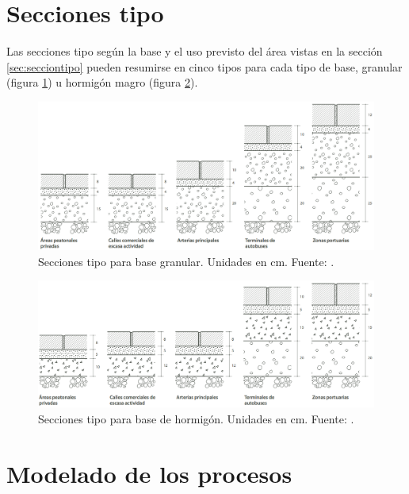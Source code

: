 \section{Secciones tipo}

Las secciones tipo según la base y el uso previsto del área vistas en la sección \ref{sec:secciontipo} pueden resumirse en cinco tipos para cada tipo de base, granular (figura \ref{fig:seccionestipogranular}) u hormigón magro (figura \ref{fig:seccionestipohormigon}).

\begin{figure}[!htb]
\centering
\includegraphics[width=15cm]{seccionestipo_1.png}
\caption[Secciones tipo para base granular.]{Secciones tipo para base granular. Unidades en cm. Fuente: \cite{fenollar}.}
\label{fig:seccionestipogranular}
\end{figure}

\begin{figure}[!htb]
\centering
\includegraphics[width=15cm]{seccionestipo_2.png}
\caption[Secciones tipo para base de hormigón.]{Secciones tipo para base de hormigón. Unidades en cm. Fuente: \cite{fenollar}.}
\label{fig:seccionestipohormigon}
\end{figure}

\section{Modelado de los procesos}

